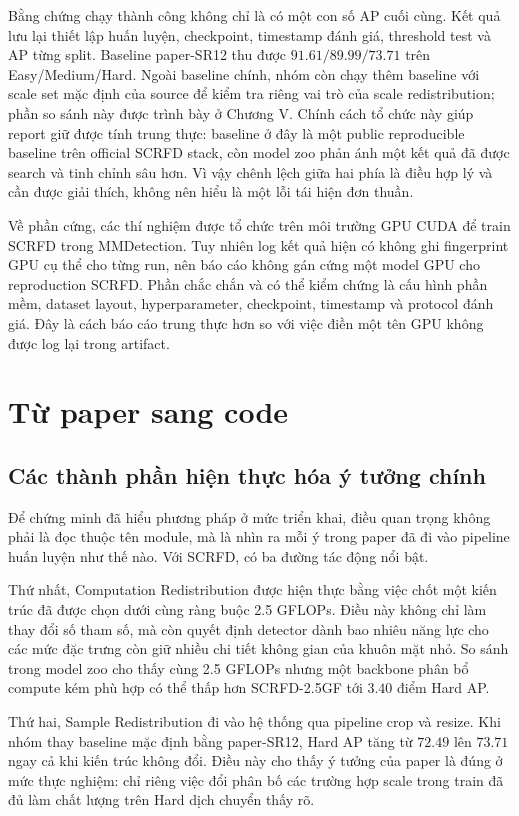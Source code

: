 Bằng chứng chạy thành công không chỉ là có một con số AP cuối cùng. Kết quả lưu lại thiết lập huấn luyện, checkpoint, timestamp đánh giá, threshold test và AP từng split. Baseline paper-SR12 thu được \(91.61/89.99/73.71\) trên Easy/Medium/Hard. Ngoài baseline chính, nhóm còn chạy thêm baseline với scale set mặc định của source để kiểm tra riêng vai trò của scale redistribution; phần so sánh này được trình bày ở Chương V. Chính cách tổ chức này giúp report giữ được tính trung thực: baseline ở đây là một public reproducible baseline trên official SCRFD stack, còn model zoo phản ánh một kết quả đã được search và tinh chỉnh sâu hơn. Vì vậy chênh lệch giữa hai phía là điều hợp lý và cần được giải thích, không nên hiểu là một lỗi tái hiện đơn thuần.

Về phần cứng, các thí nghiệm được tổ chức trên môi trường GPU CUDA để train SCRFD trong MMDetection. Tuy nhiên log kết quả hiện có không ghi fingerprint GPU cụ thể cho từng run, nên báo cáo không gán cứng một model GPU cho reproduction SCRFD. Phần chắc chắn và có thể kiểm chứng là cấu hình phần mềm, dataset layout, hyperparameter, checkpoint, timestamp và protocol đánh giá. Đây là cách báo cáo trung thực hơn so với việc điền một tên GPU không được log lại trong artifact.

\chapter{Từ paper sang code}

\section{Các thành phần hiện thực hóa ý tưởng chính}

Để chứng minh đã hiểu phương pháp ở mức triển khai, điều quan trọng không phải là đọc thuộc tên module, mà là nhìn ra mỗi ý trong paper đã đi vào pipeline huấn luyện như thế nào. Với SCRFD, có ba đường tác động nổi bật.

Thứ nhất, Computation Redistribution được hiện thực bằng việc chốt một kiến trúc đã được chọn dưới cùng ràng buộc 2.5 GFLOPs. Điều này không chỉ làm thay đổi số tham số, mà còn quyết định detector dành bao nhiêu năng lực cho các mức đặc trưng còn giữ nhiều chi tiết không gian của khuôn mặt nhỏ. So sánh trong model zoo cho thấy cùng 2.5 GFLOPs nhưng một backbone phân bổ compute kém phù hợp có thể thấp hơn SCRFD-2.5GF tới \(3.40\) điểm Hard AP.

Thứ hai, Sample Redistribution đi vào hệ thống qua pipeline crop và resize. Khi nhóm thay baseline mặc định bằng paper-SR12, Hard AP tăng từ \(72.49\) lên \(73.71\) ngay cả khi kiến trúc không đổi. Điều này cho thấy ý tưởng của paper là đúng ở mức thực nghiệm: chỉ riêng việc đổi phân bố các trường hợp scale trong train đã đủ làm chất lượng trên Hard dịch chuyển thấy rõ.


